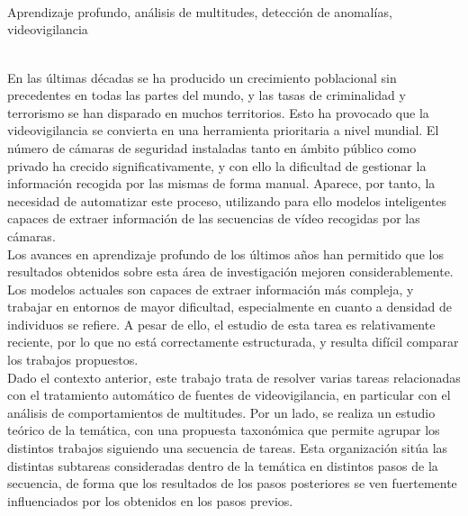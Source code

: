 \begin{center}
  {\large\bfseries \ProjectTitle}\\
\end{center}

\begin{center}
  \AuthorName\\
  \vspace{0.7cm}
  \\
  Aprendizaje profundo, análisis de multitudes, detección de
  anomalías, videovigilancia\\
  \vspace{0.7cm}
  \\

\end{center}

En las últimas décadas se ha producido un crecimiento poblacional sin
precedentes en todas las partes del mundo, y las tasas de criminalidad
y terrorismo se han disparado en muchos territorios. Esto ha provocado
que la videovigilancia se convierta en una herramienta prioritaria a
nivel mundial. El número de cámaras de seguridad instaladas tanto en
ámbito público como privado ha crecido significativamente, y con ello
la dificultad de gestionar la información recogida por las mismas de
forma manual. Aparece, por tanto, la necesidad de automatizar este
proceso, utilizando para ello modelos inteligentes capaces de extraer
información de las secuencias de vídeo recogidas por las cámaras.\\

Los avances en aprendizaje profundo de los últimos años han permitido
que los resultados obtenidos sobre esta área de investigación mejoren
considerablemente. Los modelos actuales son capaces de extraer
información más compleja, y trabajar en entornos de mayor dificultad,
especialmente en cuanto a densidad de individuos se refiere. A pesar
de ello, el estudio de esta tarea es relativamente reciente, por lo
que no está correctamente estructurada, y resulta difícil comparar los
trabajos propuestos.\\

Dado el contexto anterior, este trabajo trata de resolver varias
tareas relacionadas con el tratamiento automático de fuentes de
videovigilancia, en particular con el análisis de comportamientos de
multitudes. Por un lado, se realiza un estudio teórico de la temática,
con una propuesta taxonómica que permite agrupar los distintos
trabajos siguiendo una secuencia de tareas. Esta organización sitúa
las distintas subtareas consideradas dentro de la temática en
distintos pasos de la secuencia, de forma que los resultados de los
pasos posteriores se ven fuertemente influenciados por los obtenidos
en los pasos previos.\\

